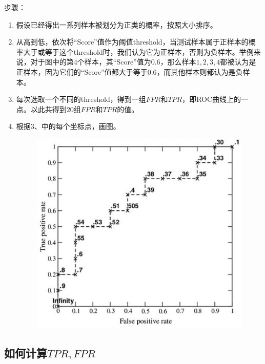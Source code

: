 步骤：

\begin{enumerate}\itemsep0em
		\item 假设已经得出一系列样本被划分为正类的概率，按照大小排序。
		\item 从高到低，依次将``Score''值作为阈值threshold，当测试样本属于正样本的概率大于或等于这个threshold时，我们认为它为正样本，否则为负样本。举例来说，对于图中的第4个样本，其``Score''值为$0.6$，那么样本$1,2,3,4$都被认为是正样本，因为它们的``Score''值都大于等于$0.6$，而其他样本则都认为是负样本。
		\item 每次选取一个不同的threshold，得到一组$FPR$和$TPR$，即ROC曲线上的一点。以此共得到$20$组$FPR$和$TPR$的值。

\item 根据3、中的每个坐标点，画图。

 \begin{figure}[h]
   \centering
   \includegraphics[width=.7\textwidth]{imgs/2.40.11.1.eps}
   \label{fig:2.40.11.1}
 \end{figure}
\end{enumerate}

\subsection{如何计算$TPR,FPR$}

